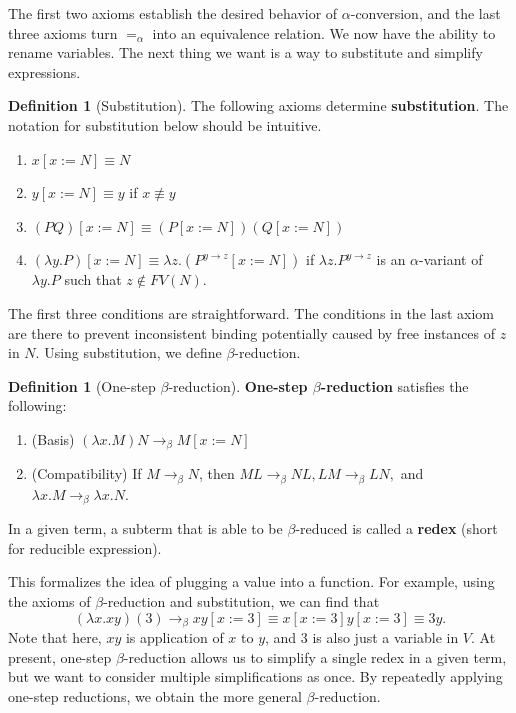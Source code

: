 \documentclass{article}
\theoremstyle{definition}
\newtheorem{definition} [theorem] {Definition}
\newcommand{\1}{\mathbb{1}}
\newcommand{\0}{\mathbb{0}}
\begin{document}
The first two axioms establish the desired behavior of $\alpha$-conversion, and the last three axioms turn $=_\alpha$ into an equivalence relation. We now have the ability to rename variables. The next thing we want is a way to substitute and simplify expressions. 

\begin{definition}[Substitution] The following axioms determine \textbf{substitution}. The notation for substitution below should be intuitive. 
\begin{enumerate}
    \item $x[x := N] \equiv N$
    \item $y[x:= N] \equiv y$ if $x \not\equiv y$
    \item $(PQ)[x := N] \equiv (P[x := N])(Q[x:= N])$
    \item $(\lambda y. P)[x:= N] \equiv \lambda z.(P^{y\to z}[x:=N])$ if $\lambda z. P^{y \to z}$ is an $\alpha$-variant of $\lambda y. P$ such that $z \notin FV(N)$. 
\end{enumerate}
\end{definition}

The first three conditions are straightforward. The conditions in the last axiom are there to prevent inconsistent binding potentially caused by free instances of $z$ in $N$. Using substitution, we define $\beta$-reduction.

\begin{definition}[One-step $\beta$-reduction] \textbf{One-step $\beta$-reduction} satisfies the following:
\begin{enumerate}
    \item (Basis) $(\lambda x. M)N \to_\beta M[x:=N]$
    \item (Compatibility) If $M \to_\beta N$, then $ML \to_\beta NL, LM \to_\beta LN,$ and $\lambda x.M \to_\beta \lambda x.N$. 
\end{enumerate}
In a given term, a subterm that is able to be $\beta$-reduced is called a \textbf{redex} (short for reducible expression).
\end{definition}

This formalizes the idea of plugging a value into a function. For example, using the axioms of $\beta$-reduction and substitution, we can find that
\[(\lambda x. xy)(3) \to_\beta xy[x:=3] \equiv x[x:=3]y[x:=3] \equiv 3y.\] 
Note that here, $xy$ is application of $x$ to $y$, and $3$ is also just a variable in $V$. At present, one-step $\beta$-reduction allows us to simplify a single redex in a given term, but we want to consider multiple simplifications as once. By repeatedly applying one-step reductions, we obtain the more general $\beta$-reduction. 
\end{document}
